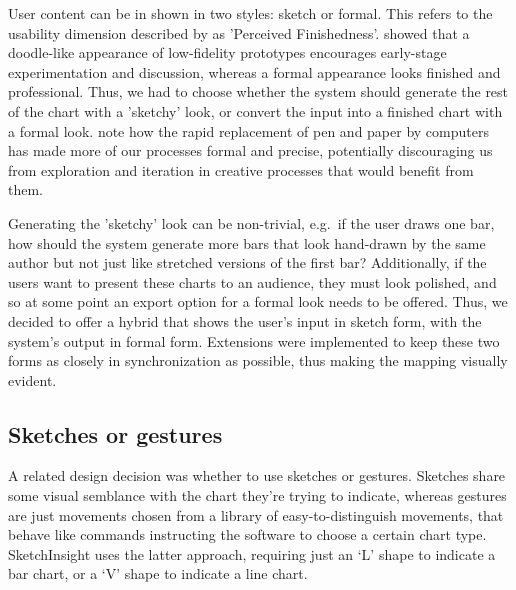 	User content can be in shown in two styles: sketch or formal. This refers to the usability dimension described by \cite{bresciani_collaborative_2008} as 'Perceived Finishedness'. \cite{yeung_effect_2008} showed that a doodle-like appearance of low-fidelity prototypes encourages early-stage experimentation and discussion, whereas a formal appearance looks finished and professional.  Thus, we had to choose whether the system should generate the rest of the chart with a 'sketchy' look, or convert the input into a finished chart with a formal look. \cite{blackwell_formality_2008} note how the rapid replacement of pen and paper by computers has made more of our processes formal and precise, potentially discouraging us from exploration and iteration in creative processes that would benefit from them.
	
	Generating the 'sketchy' look can be non-trivial, \citep{plimmer_sketchnode:_2010, wang_sketchset:_2011} e.g.\ if the user draws one bar, how should the system generate more bars that look hand-drawn by the same author but not just like stretched versions of the first bar? Additionally, if the users want to present these charts to an audience, they must look polished, and so at some point an export option for a formal look needs to be offered. Thus, we decided to offer a hybrid that shows the user's input in sketch form, with the system's output in formal form. Extensions were implemented to keep these two forms as closely in synchronization as possible, thus making the mapping visually evident.
	
	\subsection{Sketches or gestures}
	A related design decision was whether to use sketches or gestures. Sketches share some visual semblance with the chart they're trying to indicate, whereas gestures are just movements chosen from a library of easy-to-distinguish movements, that behave like commands instructing the software to choose a certain chart type. SketchInsight \citep{walny_understanding_2012} uses the latter approach, requiring just an `L' shape to indicate a bar chart, or a `V' shape to indicate a line chart. 
	
		

